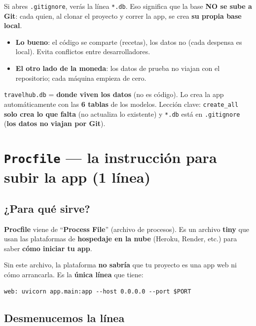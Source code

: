 \documentclass[11pt,a4paper]{article}
\begin{document}
Si abres \texttt{.gitignore}, verás la línea \texttt{*.db}. Eso significa que la base
\textbf{NO se sube a Git}: cada quien, al clonar el proyecto y correr la app, se crea \textbf{su
propia base local}.

\begin{itemize}
    \item \textbf{Lo bueno}: el código se comparte (recetas), los datos no (cada despensa es
    local). Evita conflictos entre desarrolladores.
    \item \textbf{El otro lado de la moneda}: los datos de prueba no viajan con el repositorio;
    cada máquina empieza de cero.
\end{itemize}

\begin{recuadro}
\texttt{travelhub.db} = \textbf{donde viven los datos} (no es código). Lo crea la app
automáticamente con las \textbf{6 tablas} de los modelos. Lección clave: \texttt{create\_all}
\textbf{solo crea lo que falta} (no actualiza lo existente) y \texttt{*.db} está en
\texttt{.gitignore} (\textbf{los datos no viajan por Git}).
\end{recuadro}

\section{\texttt{Procfile} --- la instrucción para subir la app (1 línea)}

\subsection{¿Para qué sirve?}

\textbf{Procfile} viene de ``\textbf{Process File}'' (archivo de procesos). Es un archivo
\textbf{tiny} que usan las plataformas de \textbf{hospedaje en la nube} (Heroku, Render, etc.)
para saber \textbf{cómo iniciar tu app}.

Sin este archivo, la plataforma \textbf{no sabría} que tu proyecto es una app web ni cómo
arrancarla. Es la \textbf{única línea} que tiene:

\begin{lstlisting}
web: uvicorn app.main:app --host 0.0.0.0 --port $PORT
\end{lstlisting}

\subsection{Desmenucemos la línea}
\end{document}

